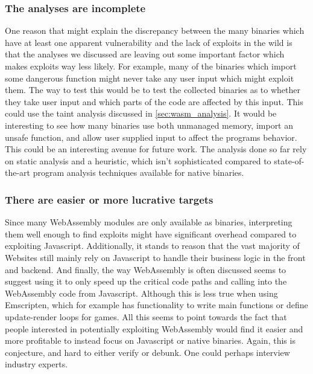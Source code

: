 \documentclass[sigconf]{acmart}
\begin{document}
{\subsubsection{The analyses are incomplete}
\label{sec:analyses_incomplete}
One reason that might explain the discrepancy between the many binaries which have at least one apparent vulnerability and the lack of exploits in the wild is that the analyses we discussed are leaving out some important factor which makes exploits way less likely. For example, many of the binaries which import some dangerous function might never take any user input which might exploit them. The way to test this would be to test the collected binaries as to whether they take user input and which parts of the code are affected by this input. This could use the taint analysis discussed in \ref{sec:wasm_analysis}. It would be interesting to see how many binaries use both unmanaged memory, import an unsafe function, and allow user supplied input to affect the programs behavior. This could be an interesting avenue for future work. The analysis done so far rely on static analysis and a heuristic, which isn't sophisticated compared to state-of-the-art program analysis techniques available for native binaries.

\subsubsection{There are easier or more lucrative targets}
\label{sec:better_targets}
Since many WebAssembly modules are only available as binaries, interpreting them well enough to find exploits might have significant overhead compared to exploiting Javascript. Additionally, it stands to reason that the vast majority of Websites still mainly rely on Javascript to handle their business logic in the front and backend. And finally, the way WebAssembly is often discussed seems to suggest using it to only speed up the critical code paths and calling into the WebAssembly code from Javascript. Although this is less true when using Emscripten, which for example has functionality to write main functions or define update-render loops for games. All this seems to point towards the fact that people interested in potentially exploiting WebAssembly would find it easier and more profitable to instead focus on Javascript or native binaries. Again, this is conjecture, and hard to either verify or debunk. One could perhaps interview industry experts.

}
\end{document}
